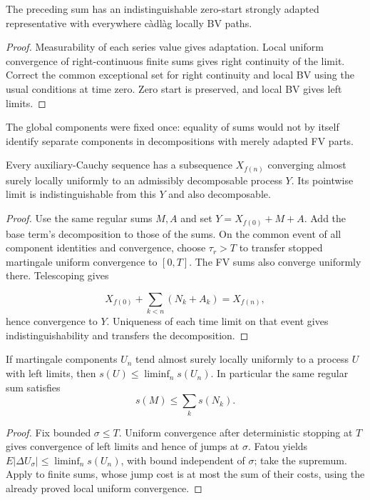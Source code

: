 \begin{lemma}
The preceding sum has an indistinguishable zero-start strongly adapted
representative with everywhere c\`adl\`ag locally BV paths.
\end{lemma}
\begin{proof}
Measurability of each series value gives adaptation. Local uniform convergence
of right-continuous finite sums gives right continuity of the limit.
Correct the common exceptional set for right continuity and local BV using
the usual conditions at time zero. Zero start is preserved, and local BV
gives left limits.
\end{proof}
The global components were fixed once: equality of sums would not by itself
identify separate components in decompositions with merely adapted FV parts.
\begin{lemma}
Every auxiliary-Cauchy sequence has a subsequence $X_{f(n)}$ converging almost
surely locally uniformly to an admissibly decomposable process $Y$.
Its pointwise limit is indistinguishable from this $Y$ and also decomposable.
\end{lemma}
\begin{proof}
Use the same regular sums $M,A$ and set $Y=X_{f(0)}+M+A$.
Add the base term's decomposition to those of the sums.
On the common event of all component identities and convergence, choose
$\tau_r>T$ to transfer stopped martingale uniform convergence to $[0,T]$.
The FV sums also converge uniformly there. Telescoping gives

\[
 X_{f(0)}+\sum_{k<n}(N_k+A_k)=X_{f(n)},
\] hence convergence to $Y$.
Uniqueness of each time limit on that event gives indistinguishability and
transfers the decomposition.
\end{proof}
\begin{lemma}
If martingale components $U_n$ tend almost surely locally uniformly to a
process $U$ with left limits, then $s(U)\leq\liminf_ns(U_n)$.
In particular the same regular sum satisfies
\[
 s(M)\leq\sum_ks(N_k).
\]
\end{lemma}
\begin{proof}
Fix bounded $\sigma\leq T$. Uniform convergence after deterministic stopping
at $T$ gives convergence of left limits and hence of jumps at $\sigma$.
Fatou yields $E|\Delta U_\sigma|\leq\liminf_ns(U_n)$, with bound independent
of $\sigma$; take the supremum. Apply to finite sums, whose jump cost is at
most the sum of their costs, using the already proved local uniform convergence.
\end{proof}
